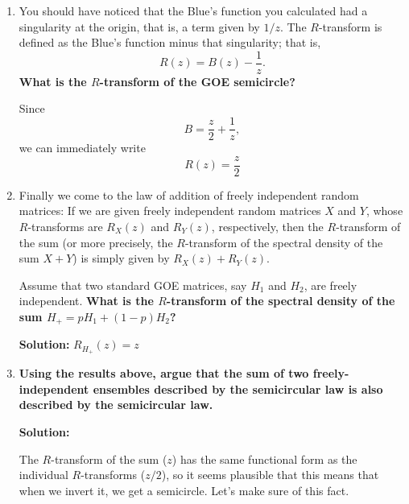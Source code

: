 \documentclass[a4paper]{article}
\begin{document}
\begin{enumerate}[label=(\alph*)]
\item You should have noticed that the Blue's function you calculated had a singularity at the origin, that is, a term given by $1/z$.  The $R$-transform is defined as the Blue's function minus that singularity; that is, 
\begin{equation}
    R(z) = B(z) - \frac{1}{z}.
\end{equation}
\textbf{What is the $R$-transform of the GOE semicircle?}

\begin{tcolorbox}
Since
\begin{equation}
    B = \frac{z}{2} + \frac{1}{z},
\end{equation}
we can immediately write
\begin{equation}
    R(z) = \frac{z}{2}
\end{equation}
\end{tcolorbox}

\item Finally we come to the law of addition of freely independent random matrices:  If we are given freely independent random matrices $X$ and $Y$, whose $R$-transforms are $R_X(z)$ and $R_Y(z)$, respectively, then the $R$-transform of the sum (or more precisely, the $R$-transform of the spectral density of the sum $X + Y$) is simply given by $R_X(z) + R_Y(z)$.  

Assume that two standard GOE matrices, say $H_1$ and $H_2$, are freely independent. \textbf{What is the $R$-transform of the spectral density of the sum $H_+ = pH_1 + (1 - p) H_2$?}

\begin{tcolorbox}
\textbf{Solution:}
$R_{H_+}(z) = z$
\end{tcolorbox}

\item \textbf{Using the results above, argue that the sum of two freely-independent ensembles described by the semicircular law is also described by the semicircular law.}

\begin{tcolorbox}
\textbf{Solution:}

The $R$-transform of the sum ($z$) has the same functional form as the individual $R$-transforms ($z/2$), so it seems plausible that this means that when we invert it, we get a semicircle.  Let's make sure of this fact.


\end{tcolorbox}
\end{enumerate}
\end{document}
